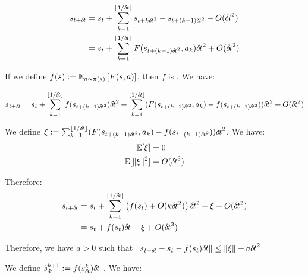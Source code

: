 
\begin{align}
  s_{t + {\delta\hspace{-.1em}t}} &= s_t + \sum_{k=1}^{\lfloor 1/{\delta\hspace{-.1em}t}\rfloor} s_{t+k{\delta\hspace{-.1em}t}^2} -  s_{t+(k-1){\delta\hspace{-.1em}t}^2} + O({\delta\hspace{-.1em}t}^2) \\
                    &= s_t + \sum_{k=1}^{\lfloor 1/{\delta\hspace{-.1em}t} \rfloor} F(s_{t+(k-1){\delta\hspace{-.1em}t}^2}, a_k){\delta\hspace{-.1em}t}^2 + O({\delta\hspace{-.1em}t}^2)
\end{align}

If we define $f(s) \mathrel{\mathop{:}}= \mathbb{E}_{a \sim \pi(s)}\left[F(s, a)\right]$, then $f$ is . We have: 

  \begin{align}
    s_{t + {\delta\hspace{-.1em}t}}   & = s_t + \sum_{k=1}^{\lfloor 1/{\delta\hspace{-.1em}t}\rfloor}
    f(s_{t+(k-1){\delta\hspace{-.1em}t}^2}){\delta\hspace{-.1em}t}^2 + \sum_{k=1}^{\lfloor 1/{\delta\hspace{-.1em}t}\rfloor} (F(s_{t+(k-1){\delta\hspace{-.1em}t}^2}, a_k) - f(s_{t+(k-1){\delta\hspace{-.1em}t}^2})){\delta\hspace{-.1em}t}^2 + O({\delta\hspace{-.1em}t}^2)        \\
  \end{align}

  We define $\xi \mathrel{\mathop{:}}= \sum_{k=1}^{\lfloor 1/{\delta\hspace{-.1em}t}\rfloor} (F(s_{t+(k-1){\delta\hspace{-.1em}t}^2}, a_k) - f(s_{t+(k-1){\delta\hspace{-.1em}t}^2})){\delta\hspace{-.1em}t}^2$. We have:
  \begin{align}
    \mathbb{E}[\xi] &= 0 \\
    \mathbb{E}[\|\xi\|^2] &= O({\delta\hspace{-.1em}t}^3)
  \end{align}

  Therefore: 
  \begin{align}
  s_{t + {\delta\hspace{-.1em}t}}  &= s_t + \sum_{k=1}^{\lfloor 1/{\delta\hspace{-.1em}t}\rfloor} \left(f(s_{t}) + O(k{\delta\hspace{-.1em}t}^2)\right){\delta\hspace{-.1em}t}^2 + \xi + O({\delta\hspace{-.1em}t}^2) \\
                      & = s_t + f(s_{t}) {\delta\hspace{-.1em}t} + \xi + O({\delta\hspace{-.1em}t}^2) 
  \end{align}

  Therefore, we have $a>0$ such that $\|s_{t + {\delta\hspace{-.1em}t}} - s_t - f(s_t){\delta\hspace{-.1em}t}\| \leq \|\xi\| + a{\delta\hspace{-.1em}t}^2$
  
We define $\tilde s_{\delta\hspace{-.1em}t}^{k+1} \mathrel{\mathop{:}}= f(s_{\delta\hspace{-.1em}t}^k){\delta\hspace{-.1em}t}$
. We have:

